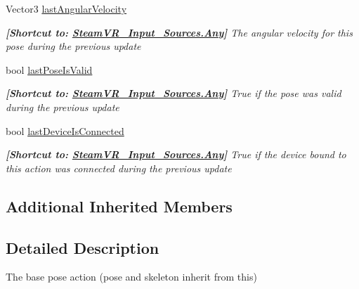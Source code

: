 \begin{DoxyCompactItemize}
Vector3 \mbox{\hyperlink{class_valve_1_1_v_r_1_1_steam_v_r___action___pose___base_ae6b3169314d9d47df2d7346bd3514d88}{last\+Angular\+Velocity}}
\begin{DoxyCompactList}\small\item\em {\bfseries{\mbox{[}Shortcut to\+: \mbox{\hyperlink{namespace_valve_1_1_v_r_a82e5bf501cc3aa155444ee3f0662853faed36a1ef76a59ee3f15180e0441188ad}{Steam\+V\+R\+\_\+\+Input\+\_\+\+Sources.\+Any}}\mbox{]}}} The angular velocity for this pose during the previous update \end{DoxyCompactList}\item 
bool \mbox{\hyperlink{class_valve_1_1_v_r_1_1_steam_v_r___action___pose___base_a88389de1985db0b02398dbbf1405eba9}{last\+Pose\+Is\+Valid}}
\begin{DoxyCompactList}\small\item\em {\bfseries{\mbox{[}Shortcut to\+: \mbox{\hyperlink{namespace_valve_1_1_v_r_a82e5bf501cc3aa155444ee3f0662853faed36a1ef76a59ee3f15180e0441188ad}{Steam\+V\+R\+\_\+\+Input\+\_\+\+Sources.\+Any}}\mbox{]}}} True if the pose was valid during the previous update \end{DoxyCompactList}\item 
bool \mbox{\hyperlink{class_valve_1_1_v_r_1_1_steam_v_r___action___pose___base_a879054dc94cfe2303fd3656be573af3f}{last\+Device\+Is\+Connected}}
\begin{DoxyCompactList}\small\item\em {\bfseries{\mbox{[}Shortcut to\+: \mbox{\hyperlink{namespace_valve_1_1_v_r_a82e5bf501cc3aa155444ee3f0662853faed36a1ef76a59ee3f15180e0441188ad}{Steam\+V\+R\+\_\+\+Input\+\_\+\+Sources.\+Any}}\mbox{]}}} True if the device bound to this action was connected during the previous update \end{DoxyCompactList}\end{DoxyCompactItemize}
\subsection*{Additional Inherited Members}


\subsection{Detailed Description}
The base pose action (pose and skeleton inherit from this) 

